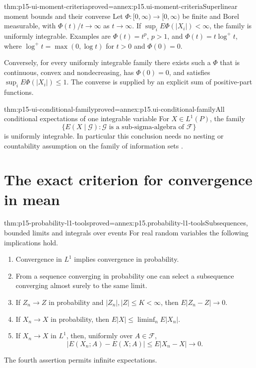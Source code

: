 \begin{hbtheorem}{thm:p15-ui-moment-criteria}{proved=annex:p15.ui-moment-criteria}{Superlinear moment bounds and their converse}
Let \(\Phi:[0,\infty)\to[0,\infty)\) be finite and Borel measurable,
with \(\Phi(t)/t\to\infty\) as \(t\to\infty\).
If \(\sup_i E\Phi(|X_i|)<\infty\), the family is uniformly integrable.
Examples are \(\Phi(t)=t^p\), \(p>1\), and
\(\Phi(t)=t\log^+t\), where \(\log^+t=\max(0,\log t)\) for \(t>0\)
and \(\Phi(0)=0\).

Conversely, for every uniformly integrable family there exists such a
\(\Phi\) that is continuous, convex and nondecreasing, has \(\Phi(0)=0\),
and satisfies \(\sup_i E\Phi(|X_i|)\leq1\).
The converse is supplied by an explicit sum of positive-part functions.
\end{hbtheorem}

\begin{hbtheorem}{thm:p15-ui-conditional-family}{proved=annex:p15.ui-conditional-family}{All conditional expectations of one integrable variable}
For \(X\in L^1(P)\), the family
\[
 \{E(X\mid\mathcal G):\mathcal G
                 \text{ is a sub-sigma-algebra of }\mathcal F\}
\]
is uniformly integrable. In particular this conclusion needs no nesting
or countability assumption on the family of information sets
\cite[thm.~4.6.1]{DurrettPTEAuthor2019}.
\end{hbtheorem}

\section{The exact criterion for convergence in mean}
\label{sec:p15-ui-convergence}

\begin{hbtheorem}{thm:p15-probability-l1-tools}{proved=annex:p15.probability-l1-tools}{Subsequences, bounded limits and integrals over events}
For real random variables the following implications hold.
\begin{enumerate}
\item Convergence in \(L^1\) implies convergence in probability.
\item From a sequence converging in probability one can select a
      subsequence converging almost surely to the same limit.
\item If \(Z_n\to Z\) in probability and \(|Z_n|,|Z|\leq K<\infty\),
      then \(E|Z_n-Z|\to0\).
\item If \(X_n\to X\) in probability, then
      \(E|X|\leq\liminf_n E|X_n|\).
\item If \(X_n\to X\) in \(L^1\), then, uniformly over \(A\in\mathcal F\),
      \[
        |E(X_n;A)-E(X;A)|\leq E|X_n-X|\longrightarrow0.
      \]
\end{enumerate}
The fourth assertion permits infinite expectations.
\end{hbtheorem}

